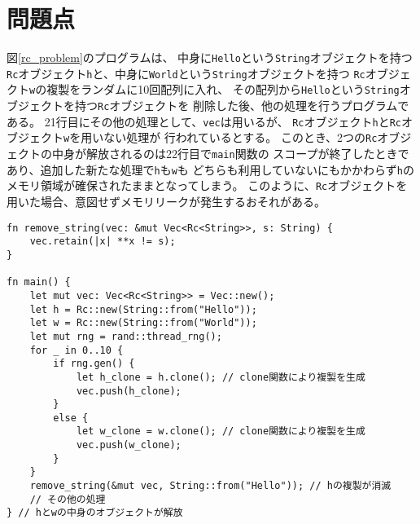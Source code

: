 \documentclass{sumiilab-paper}
\theoremstyle{mystyle}
\numberwithin{definition}{chapter} %
\begin{document}
\chapter{問題点}
図\ref{rc_problem}のプログラムは、
中身に\texttt{Hello}という\texttt{String}オブジェクトを持つ
\texttt{Rc}オブジェクト\texttt{h}と、中身に\texttt{World}という\texttt{String}オブジェクトを持つ
\texttt{Rc}オブジェクト\texttt{w}の複製をランダムに10回配列に入れ、
その配列から\texttt{Hello}という\texttt{String}オブジェクトを持つ\texttt{Rc}オブジェクトを
削除した後、他の処理を行うプログラムである。
21行目にその他の処理として、\texttt{vec}は用いるが、
\texttt{Rc}オブジェクト\texttt{h}と\texttt{Rc}オブジェクト\texttt{w}を用いない処理が
行われているとする。
このとき、2つの\texttt{Rc}オブジェクトの中身が解放されるのは22行目で\texttt{main}関数の
スコープが終了したときであり、追加した新たな処理で\texttt{h}も\texttt{w}も
どちらも利用していないにもかかわらず\texttt{h}のメモリ領域が確保されたままとなってしまう。
このように、\texttt{Rc}オブジェクトを用いた場合、意図せずメモリリークが発生するおそれがある。
\begin{lstlisting}[caption=Rcオブジェクトを利用する際の問題点, label=rc_problem, captionpos=b]
fn remove_string(vec: &mut Vec<Rc<String>>, s: String) {
    vec.retain(|x| **x != s);
}
  
fn main() {
    let mut vec: Vec<Rc<String>> = Vec::new();
    let h = Rc::new(String::from("Hello"));
    let w = Rc::new(String::from("World"));
    let mut rng = rand::thread_rng();
    for _ in 0..10 {
        if rng.gen() {
            let h_clone = h.clone(); // clone関数により複製を生成
            vec.push(h_clone);
        }
        else {
            let w_clone = w.clone(); // clone関数により複製を生成
            vec.push(w_clone);
        }
    }
    remove_string(&mut vec, String::from("Hello")); // hの複製が消滅
    // その他の処理
} // hとwの中身のオブジェクトが解放
\end{lstlisting}
\end{document}
